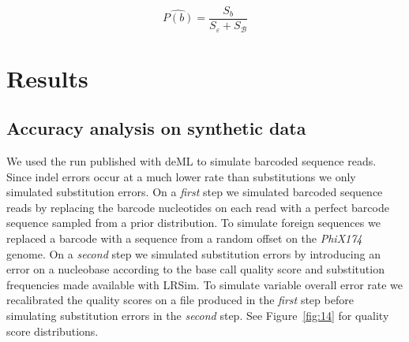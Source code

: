 \documentclass[10pt,twocolumn]{article}
\begin{document}
%
\begin{equation}
\hat{P(b)} = \frac{S_{b}}{S_{\varepsilon} + S_\mathcal{B}}
\end{equation}
%

\section*{Results}

\subsection*{Accuracy analysis on synthetic data}


We used the run published with deML to simulate barcoded sequence reads. Since indel errors occur at a much lower rate than substitutions \citep{doi:10.1038/s41598-018-29325-6} we only simulated substitution errors. On a \emph{first} step we simulated barcoded sequence reads by replacing the barcode nucleotides on each read with a perfect barcode sequence sampled from a prior distribution. To simulate foreign sequences we replaced a barcode with a sequence from a random offset on the \emph{PhiX174} genome. On a \emph{second} step we simulated substitution errors by introducing an error on a nucleobase according to the base call quality score and substitution frequencies made available with LRSim\citep{doi:10.1016/j.csbj.2017.10.002}. To simulate variable overall error rate we recalibrated the quality scores on a file produced in the \emph{first} step before simulating substitution errors in the \emph{second} step. See Figure~\ref{fig:14} for quality score distributions.
\end{document}
